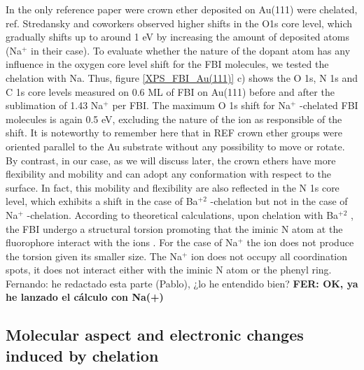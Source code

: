 \documentclass[aps,prl,reprint,longbibliography,superscriptaddress]{revtex4-1}
\def\Ba{Ba$^{+2}$ }
\def\Na{Na$^{+}$ }
\newcommand{\completar}[1]{{\color{red} #1}}
\begin{document}
In the only reference paper were crown ether deposited on Au(111) were chelated, ref. \cite{stredansky_-surface_2019} Stredansky and coworkers observed higher shifts in the O1s core level, which gradually shifts up to around 1 eV by increasing the amount of deposited atoms (\Na in their case). 
To evaluate whether the nature of the dopant atom has any influence in the oxygen core level shift for the FBI molecules, we tested the chelation with Na. Thus, figure \ref{XPS_FBI_Au(111)} c) shows the O 1s, N 1s and C 1s core levels measured on 0.6 ML of FBI on Au(111) before and after the sublimation of 1.43 \Na per FBI. The maximum O 1s shift for \Na-chelated FBI molecules is again 0.5 eV, excluding the nature of the ion as responsible of the shift.
It is noteworthy to remember here that in REF \cite{stredansky_-surface_2019} crown ether groups were oriented parallel to the Au substrate without any possibility to move or rotate. By contrast, in our case, as we will discuss later, the crown ethers have more flexibility and mobility and can adopt any conformation with respect to the surface. In fact, this mobility and flexibility are also reflected in the N 1s core level, which exhibits a shift in the case of \Ba-chelation but not in the case of \Na-chelation.
According to theoretical calculations, upon chelation with \Ba, the FBI undergo a structural torsion promoting that the iminic N atom at the fluorophore interact with the ions \cite{rivilla_fluorescent_2020}.  For the case of \Na the ion does not produce the torsion given its smaller size. The \Na ion does not  occupy all coordination spots, it does not interact either with the iminic N atom or the phenyl ring. \completar{Fernando: he redactado esta parte (Pablo), ¿lo he entendido bien? \textbf{FER: OK, ya he lanzado el cálculo con Na(+)}}



\subsection{Molecular aspect and electronic changes induced by chelation}
\end{document}
